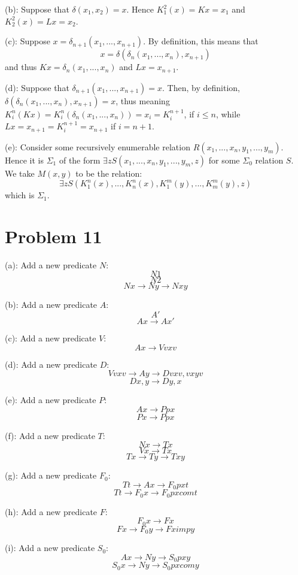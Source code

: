 \documentclass{article}
\theoremstyle{definition}
\begin{document}
(b): Suppose that $\delta\left(x_1,x_2\right)=x$. Hence $K^2_1\left(x\right)=Kx=x_1$ and $K^2_2\left(x\right)=Lx=x_2$.


(c): Suppose $x=\delta_{n+1}\left(x_1,...,x_{n+1}\right)$. By definition, this means that
\[ x=\delta\left(\delta_n\left(x_1,...,x_n\right),x_{n+1}\right) \] and thus $Kx=\delta_n\left(x_1,...,x_n\right)$ and $Lx=x_{n+1}$.


(d): Suppose that $\delta_{n+1}\left(x_1,...,x_{n+1}\right)=x$. Then, by definition, 
$\delta\left(\delta_n\left(x_1,...,x_n\right),x_{n+1}\right)=x$, thus meaning $K^n_i\left(Kx\right)=K^n_i\left(\delta_n\left(x_1,...,x_n\right)\right)=
x_i=K^{n+1}_i$, if $i\le n$, while $Lx=x_{n+1}=K^{n+1}_i=x_{n+1}$ if $i=n+1$. 


(e): Consider some recursively enumerable relation $R\left(x_1,...,x_n,y_1,...,y_m\right)$. Hence it is $\Sigma_1$ of the form
$\exists zS\left(x_1,...,x_n,y_1,...,y_m,z\right)$ for some $\Sigma_0$ relation $S$. We take $M\left(x,y\right)$ to be the relation:
\[ \exists zS\left(K^n_1\left(x\right),...,K^n_n\left(x\right),K^m_1\left(y\right),...,K^m_m\left(y\right),z\right) \] which is $\Sigma_1$.

\section*{Problem 11}
(a): Add a new predicate $N$: \[ N1 \] \[ N2 \] \[ Nx\rightarrow Ny\rightarrow Nxy \]


(b): Add a new predicate $A$: \[ A' \] \[ Ax\rightarrow Ax' \]


(c): Add a new predicate $V$: \[ Ax\rightarrow Vvxv \]


(d): Add a new predicate $D$: \[ Vvxv\rightarrow Ay\rightarrow Dvxv,vxyv \] \[ Dx,y\rightarrow Dy,x \]


(e): Add a new predicate $P$: \[ Ax\rightarrow Ppx \] \[ Px\rightarrow Ppx \] 


(f): Add a new predicate $T$: \[ Nx\rightarrow Tx \] \[ Vx\rightarrow Tx \] \[ Tx\rightarrow Ty\rightarrow Txy \]


(g): Add a new predicate $F_0$: \[ Tt\rightarrow Ax\rightarrow F_0pxt \] \[ Tt\rightarrow F_0x\rightarrow F_0pxcomt \]  


(h): Add a new predicate $F$: \[ F_0x\rightarrow Fx \] \[ Fx\rightarrow F_0y\rightarrow Fximpy \]


(i): Add a new predicate $S_0$: \[ Ax\rightarrow Ny\rightarrow S_0pxy \] \[ S_0x\rightarrow Ny\rightarrow S_0pxcomy \]
\end{document}
